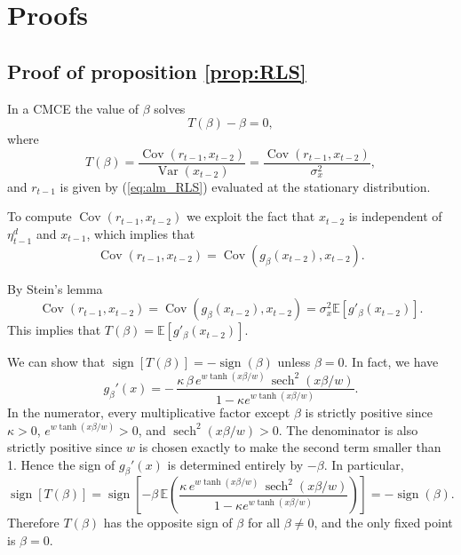 \section{Proofs}\label{sec:proofs}
\subsection{Proof of proposition \ref{prop:RLS}}\label{app:proof_RLS}

In a CMCE the value of $\beta$ solves
\begin{equation}
    T(\beta) - \beta = 0,
\end{equation}
where 
\begin{equation}
    T(\beta) = \frac{\operatorname{Cov}(r_{t-1}, x_{t-2})}{\operatorname{Var}(x_{t-2})} = \frac{\operatorname{Cov}(r_{t-1}, x_{t-2})}{\sigma^2_x},
\end{equation}
and $r_{t-1}$ is given by (\ref{eq:alm_RLS}) evaluated at the stationary distribution.

To compute $\operatorname{Cov}(r_{t-1}, x_{t-2})$ we exploit the fact that $x_{t-2}$ is independent of $\eta^d_{t-1}$ and $x_{t-1}$, which implies that
\begin{equation}
    \operatorname{Cov}(r_{t-1}, x_{t-2}) = \operatorname{Cov}\left(g_{\beta}(x_{t-2}), x_{t-2}\right).
\end{equation}

By Stein's lemma
\begin{equation}
    \operatorname{Cov}(r_{t-1}, x_{t-2}) = \operatorname{Cov}(g_{\beta}(x_{t-2}), x_{t-2}) = \sigma^2_x \mathbb{E}\left[g'_{\beta}(x_{t-2})\right].
\end{equation}
This implies that $T(\beta) = \mathbb{E}\left[g'_{\beta}(x_{t-2})\right]$.

We can show that  $\operatorname{sign}\left[T(\beta)\right] = - \operatorname{sign}(\beta)$ unless $\beta = 0$. In fact, we have
\begin{equation}
    g_{\beta}'(x)
= -\,\frac{\kappa\,\beta\, e^{w\tanh(x \beta/w)}\, \operatorname{sech}^2(x \beta/w)}
        {1 - \kappa e^{w\tanh(x \beta/w)}}.
\end{equation}
In the numerator, every multiplicative factor except $\beta$ is strictly positive since
$\kappa>0$, $e^{w\tanh(x \beta/w)}>0$, and $\operatorname{sech}^2(x \beta/w)>0$.
The denominator is also strictly positive since $w$ is chosen exactly to make the second term smaller than 1.
Hence the sign of $g_\beta'(x)$ is determined entirely by $-\beta$.
In particular,
\begin{equation}
    \operatorname{sign}\left[T(\beta)\right] 
    = \operatorname{sign}\left[ - \beta \,\mathbb{E}\left(\frac{\kappa\, e^{w\tanh(x \beta/w)}\, \operatorname{sech}^2(x \beta/w)}
        {1 - \kappa e^{w\tanh(x \beta/w)}}\right)\right] = - \operatorname{sign}(\beta).
\end{equation}
Therefore $T(\beta)$ has the opposite sign of $\beta$ for all $\beta \neq 0$, and the only fixed point is $\beta = 0$.

